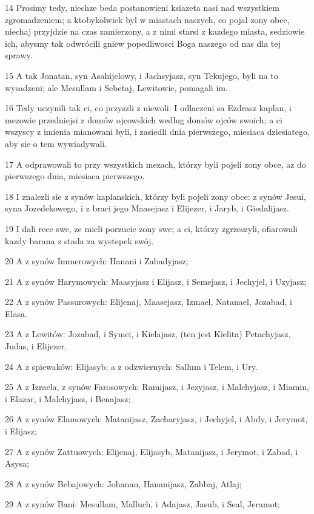 \par 14 Prosimy tedy, niechze beda postanowieni ksiazeta nasi nad wszystkiem zgromadzeniem; a ktobykolwiek byl w miastach naszych, co pojal zony obce, niechaj przyjdzie na czas zamierzony, a z nimi starsi z kazdego miasta, sedziowie ich, abysmy tak odwrócili gniew popedliwosci Boga naszego od nas dla tej sprawy.
\par 15 A tak Jonatan, syn Asahijelowy, i Jachsyjasz, syn Tekujego, byli na to wysadzeni; ale Mesullam i Sebetaj, Lewitowie, pomagali im.
\par 16 Tedy uczynili tak ci, co przyszli z niewoli. I odlaczeni sa Ezdrasz kaplan, i mezowie przedniejsi z domów ojcowskich wedlug domów ojców swoich; a ci wszyscy z imienia mianowani byli, i zasiedli dnia pierwszego, miesiaca dziesiatego, aby sie o tem wywiadywali.
\par 17 A odprawowali to przy wszystkich mezach, którzy byli pojeli zony obce, az do pierwszego dnia, miesiaca pierwszego.
\par 18 I znalezli sie z synów kaplanskich, którzy byli pojeli zony obce: z synów Jesui, syna Jozedekowego, i z braci jego Maasejasz i Elijezer, i Jaryb, i Giedalijasz.
\par 19 I dali rece swe, ze mieli porzucic zony swe; a ci, którzy zgrzeszyli, ofiarowali kazdy barana z stada za wystepek swój.
\par 20 A z synów Immerowych: Hanani i Zabadyjasz;
\par 21 A z synów Harymowych: Maasyjasz i Elijasz, i Semejasz, i Jechyjel, i Uzyjasz;
\par 22 A z synów Passurowych: Elijenaj, Maasejasz, Izmael, Natanael, Jozabad, i Elasa.
\par 23 A z Lewitów: Jozabad, i Symei, i Kielajasz, (ten jest Kielita) Petachyjasz, Judas, i Elijezer.
\par 24 A z spiewaków: Elijasyb; a z odzwiernych: Sallum i Telem, i Ury.
\par 25 A z Izraela, z synów Farosowych: Ramijasz, i Jezyjasz, i Malchyjasz, i Miamin, i Elazar, i Malchyjasz, i Benajasz;
\par 26 A z synów Elamowych: Matanijasz, Zacharyjasz, i Jechyjel, i Abdy, i Jerymot, i Elijasz;
\par 27 A z synów Zattuowych: Elijenaj, Elijasyb, Matanijasz, i Jerymot, i Zabad, i Asysa;
\par 28 A z synów Bebajowych: Johanan, Hananijasz, Zabbaj, Atlaj;
\par 29 A z synów Bani: Mesullam, Malluch, i Adajasz, Jasub, i Seal, Jeramot;
